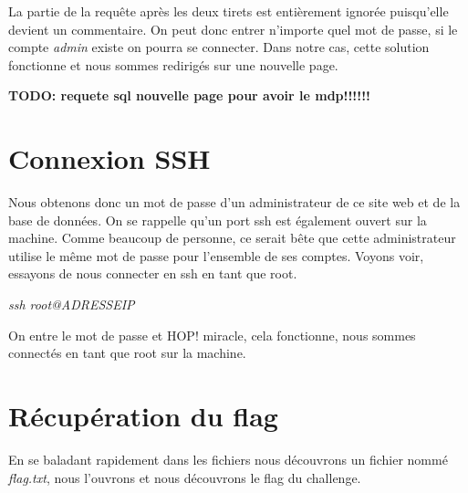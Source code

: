 \documentclass{article}
\begin{document}
La partie de la requête après les deux tirets est entièrement ignorée puisqu'elle devient un commentaire. On peut donc entrer n'importe quel mot de passe, si le compte \textit{admin} existe on pourra se connecter. Dans notre cas, cette solution fonctionne et nous sommes redirigés sur une nouvelle page.\newline 

\textbf{TODO: requete sql nouvelle page pour avoir le mdp!!!!!!}

\section{Connexion SSH}
Nous obtenons donc un mot de passe d'un administrateur de ce site web et de la base de données. On se rappelle qu'un port ssh est également ouvert sur la machine. Comme beaucoup de personne, ce serait bête que cette administrateur utilise le même mot de passe pour l'ensemble de ses comptes. Voyons voir, essayons de nous connecter en ssh en tant que root. 

\begin{center}
    \textit{ssh root@ADRESSEIP}\newline
\end{center}

On entre le mot de passe et HOP! miracle, cela fonctionne, nous sommes connectés en tant que root sur la machine.

\section{Récupération du flag}
En se baladant rapidement dans les fichiers nous découvrons un fichier nommé \textit{flag.txt}, nous l'ouvrons et nous découvrons le flag du challenge.
\end{document}
